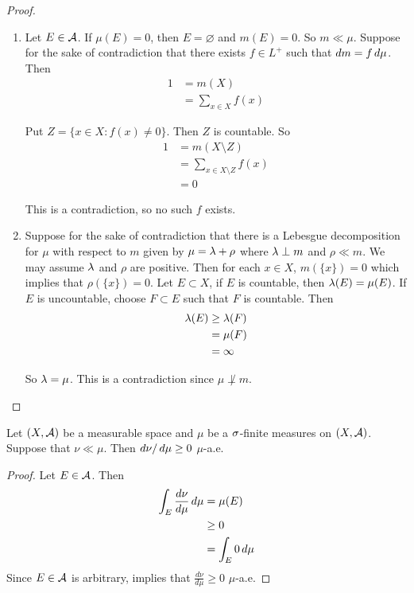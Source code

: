 \documentclass{book}
\begin{document}
	\begin{proof}
		\begin{enumerate}
			\item Let $E \in \mathcal{A}$. If $\mu(E) = 0$, then $E = \varnothing$ and $m(E) = 0$. So $m \ll \mu$. Suppose for the sake of contradiction that there exists $f \in L^+$ such that $dm = f \, d \mu$. Then 
			\begin{align*}
				1
				&= m(X) \\
				&= \sum\limits_{x \in X} f(x)
			\end{align*}
			
			Put $Z = \{x \in X: f(x) \neq 0 \}$. Then $Z$ is countable. So 
			\begin{align*}
				1
				&= m(X \setminus Z) \\
				&= \sum\limits_{x \in X \setminus Z} f(x)\\
				&= 0
			\end{align*}
			
			This is a contradiction, so no such $f$ exists.
			
			\item Suppose for the sake of contradiction that there is a Lebesgue decomposition for $\mu$ with respect to $m$ given by $\mu = \lambda + \rho$ where $\lambda \perp m$ and $\rho \ll m$. We may assume $\lambda$ and $\rho$ are positive. Then for each $x \in X$, $m(\{x\})=0$ which implies that $\rho(\{x\}) = 0$. Let $E \subset X$, if $E$ is countable, then $\lambda(E) = \mu(E)$. If $E$ is uncountable, choose $F \subset E$ such that $F$ is countable. Then 
			\begin{align*}
				\lambda(E) 
				& \geq \lambda(F) \\
				& = \mu(F) \\
				&= \infty
			\end{align*}
			
			So $\lambda = \mu$. This is a contradiction since $\mu \not \perp m$.
		\end{enumerate}
	\end{proof}

	\begin{ex}
		Let $(X, \mathcal{A})$ be a measurable space and $\mu$ be a $\sigma$-finite measures on $(X, \mathcal{A})$. Suppose that $\nu \ll \mu$. Then $d\nu / \, d \mu \geq 0$ $\mu$-a.e.
	\end{ex}

	\begin{proof}
		Let $E \in \mathcal{A}$. Then 
		\begin{align*}
			\int_E \frac{d \nu}{d \mu} \, d \mu 
			& = \mu(E) \\
			& \geq 0 \\
			& = \int_E 0 \, d \mu 
		\end{align*}
		Since $E \in \mathcal{A}$ is arbitrary,   implies that $\frac{d \nu}{d \mu} \geq 0$ $\mu$-a.e.
	\end{proof}
	
\end{document}
